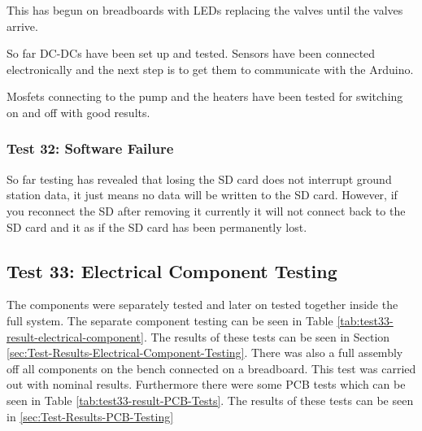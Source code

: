 This has begun on breadboards with LEDs replacing the valves until the valves arrive. 

So far DC-DCs have been set up and tested. Sensors have been connected electronically and the next step is to get them to communicate with the Arduino.

Mosfets connecting to the pump and the heaters have been tested for switching on and off with good results.

\subsubsection{Test 32: Software Failure}

So far testing has revealed that losing the SD card does not interrupt ground station data, it just means no data will be written to the SD card. However, if you reconnect the SD after removing it currently it will not connect back to the SD card and it as if the SD card has been permanently lost.

\pagebreak
\subsection{Test 33: Electrical Component Testing}
\label{sec:test33result}
The components were separately tested and later on tested together inside the full system. The separate component testing can be seen in Table \ref{tab:test33-result-electrical-component}. The results of these tests can be seen in Section \ref{sec:Test-Results-Electrical-Component-Testing}. There was also a full assembly off all components on the bench connected on a breadboard. This test was carried out with nominal results. Furthermore there were some PCB tests which can be seen in Table \ref{tab:test33-result-PCB-Tests}. The results of these tests can be seen in \ref{sec:Test-Results-PCB-Testing}





